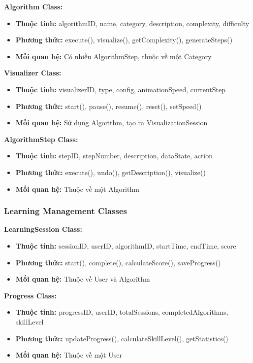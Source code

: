 \textbf{Algorithm Class:}
\begin{itemize}
    \item \textbf{Thuộc tính:} algorithmID, name, category, description, complexity, difficulty
    \item \textbf{Phương thức:} execute(), visualize(), getComplexity(), generateSteps()
    \item \textbf{Mối quan hệ:} Có nhiều AlgorithmStep, thuộc về một Category
\end{itemize}

\textbf{Visualizer Class:}
\begin{itemize}
    \item \textbf{Thuộc tính:} visualizerID, type, config, animationSpeed, currentStep
    \item \textbf{Phương thức:} start(), pause(), resume(), reset(), setSpeed()
    \item \textbf{Mối quan hệ:} Sử dụng Algorithm, tạo ra VisualizationSession
\end{itemize}

\textbf{AlgorithmStep Class:}
\begin{itemize}
    \item \textbf{Thuộc tính:} stepID, stepNumber, description, dataState, action
    \item \textbf{Phương thức:} execute(), undo(), getDescription(), visualize()
    \item \textbf{Mối quan hệ:} Thuộc về một Algorithm
\end{itemize}

\subsubsection{Learning Management Classes}

\textbf{LearningSession Class:}
\begin{itemize}
    \item \textbf{Thuộc tính:} sessionID, userID, algorithmID, startTime, endTime, score
    \item \textbf{Phương thức:} start(), complete(), calculateScore(), saveProgress()
    \item \textbf{Mối quan hệ:} Thuộc về User và Algorithm
\end{itemize}

\textbf{Progress Class:}
\begin{itemize}
    \item \textbf{Thuộc tính:} progressID, userID, totalSessions, completedAlgorithms, skillLevel
    \item \textbf{Phương thức:} updateProgress(), calculateSkillLevel(), getStatistics()
    \item \textbf{Mối quan hệ:} Thuộc về một User
\end{itemize}

